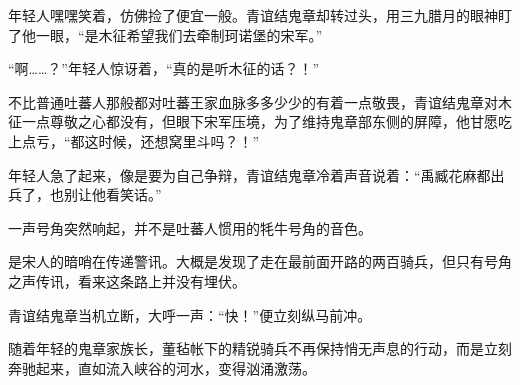 年轻人嘿嘿笑着，仿佛捡了便宜一般。青谊结鬼章却转过头，用三九腊月的眼神盯了他一眼，“是木征希望我们去牵制珂诺堡的宋军。”

“啊……？”年轻人惊讶着，“真的是听木征的话？！”

不比普通吐蕃人那般都对吐蕃王家血脉多多少少的有着一点敬畏，青谊结鬼章对木征一点尊敬之心都没有，但眼下宋军压境，为了维持鬼章部东侧的屏障，他甘愿吃上点亏，“都这时候，还想窝里斗吗？！”

年轻人急了起来，像是要为自己争辩，青谊结鬼章冷着声音说着：“禹臧花麻都出兵了，也别让他看笑话。”

一声号角突然响起，并不是吐蕃人惯用的牦牛号角的音色。

是宋人的暗哨在传递警讯。大概是发现了走在最前面开路的两百骑兵，但只有号角之声传讯，看来这条路上并没有埋伏。

青谊结鬼章当机立断，大呼一声：“快！”便立刻纵马前冲。

随着年轻的鬼章家族长，董毡帐下的精锐骑兵不再保持悄无声息的行动，而是立刻奔驰起来，直如流入峡谷的河水，变得汹涌激荡。


